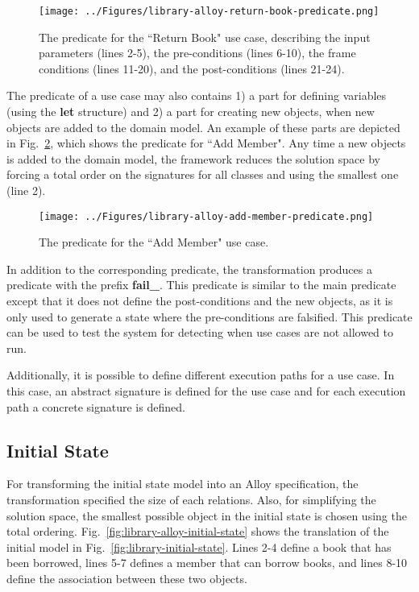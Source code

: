 \begin{figure}[h]
\centering
\texttt{[image: ../Figures/library-alloy-return-book-predicate.png]}
\caption{The predicate for the ``Return Book" use case, describing the input parameters (lines 2-5), the pre-conditions (lines 6-10), the frame conditions (lines 11-20), and the post-conditions (lines 21-24).}
\label{fig:library-alloy-return-book-predicate}
\end{figure}

The predicate of a use case may also contains 1) a part for defining variables (using the \textbf{let} structure) and 2) a part for creating new objects, when new objects are added to the domain model. An example of these parts are depicted in Fig.~\ref{fig:library-alloy-add-member-predicate}, which shows the predicate for ``Add Member". Any time a new objects is added to the domain model, the framework reduces the solution space by forcing a total order on the signatures for all classes and using the smallest one (line 2).

\begin{figure}[h]
\centering
\texttt{[image: ../Figures/library-alloy-add-member-predicate.png]}
\caption{The predicate for the ``Add Member" use case.}
\label{fig:library-alloy-add-member-predicate}
\end{figure}

In addition to the corresponding predicate, the transformation produces a predicate with the prefix \textbf{fail\_}. This predicate is similar to the main predicate except that it does not define the post-conditions and the new objects, as it is only used to generate a state where the pre-conditions are falsified. This predicate can be used to test the system for  detecting when use cases are not allowed to run.

Additionally, it is possible to define different execution paths for a use case. In this case, an abstract signature is defined for the use case and for each execution path a concrete signature is defined. 

\subsection{Initial State}
\label{sec:alloy-initial-state}
For transforming the initial state model into an Alloy specification, the transformation specified the size of each relations. Also, for simplifying the solution space, the smallest possible object in the initial state is chosen using the total ordering. Fig.~\ref{fig:library-alloy-initial-state} shows the translation of the initial model in Fig.~\ref{fig:library-initial-state}. Lines 2-4 define a book that has been borrowed, lines 5-7 defines a member that can borrow books, and lines 8-10 define the association between these two objects.

